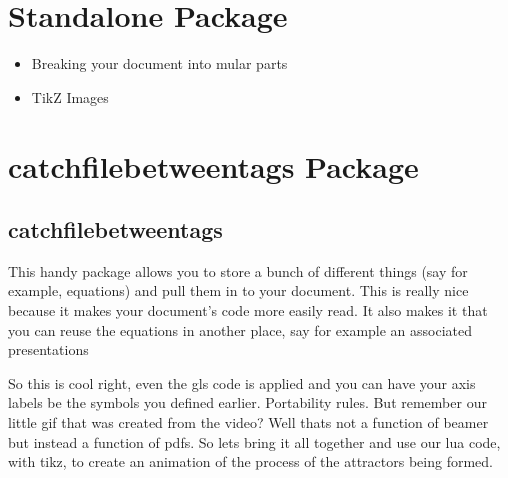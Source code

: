 \documentclass[hidelinks, float=false, crop=false]{standalone}
\begin{document}
    \section{Standalone Package}
        \begin{itemize}
            \item Breaking your document into mular parts
            \item TikZ Images
        \end{itemize}
    \section{catchfilebetweentags Package}
        \subsection{catchfilebetweentags}
            This handy package allows you to store a bunch of different things (say for example, equations) and pull them in to your document. This is really nice because it makes your document's code more easily read. It also makes it that you can reuse the equations in another place, say for example an associated presentations



            So this is cool right, even the gls code is applied and you can have your axis labels be the symbols you defined earlier. Portability rules.
            But remember our little gif that was created from the video? Well thats not a function of beamer but instead a function of pdfs. So lets bring it all together and use our lua code, with tikz, to create an animation of the process of the attractors being formed.


    \clearpage
    \standaloneBib
\end{document}
